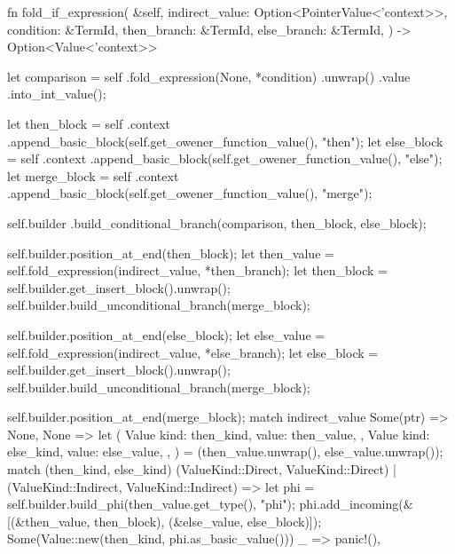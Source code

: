 \documentclass[
  oneside,
  english,
  coorientadorbanca,
  noabntexcite
]{ufsc-thesis-rn46-2019}
\begin{document}
\begin{rustcode}
{    fn fold_if_expression(
        &self,
        indirect_value: Option<PointerValue<'context>>,
        condition: &TermId,
        then_branch: &TermId,
        else_branch: &TermId,
    ) -> Option<Value<'context>> {
        let comparison = self
            .fold_expression(None, *condition)
            .unwrap()
            .value
            .into_int_value();

        let then_block = self
            .context
            .append_basic_block(self.get_owener_function_value(), "then");
        let else_block = self
            .context
            .append_basic_block(self.get_owener_function_value(), "else");
        let merge_block = self
            .context
            .append_basic_block(self.get_owener_function_value(), "merge");

        self.builder
            .build_conditional_branch(comparison, then_block, else_block);

        self.builder.position_at_end(then_block);
        let then_value = self.fold_expression(indirect_value, *then_branch);
        let then_block = self.builder.get_insert_block().unwrap();
        self.builder.build_unconditional_branch(merge_block);

        self.builder.position_at_end(else_block);
        let else_value = self.fold_expression(indirect_value, *else_branch);
        let else_block = self.builder.get_insert_block().unwrap();
        self.builder.build_unconditional_branch(merge_block);

        self.builder.position_at_end(merge_block);
        match indirect_value {
            Some(ptr) => None,
            None => {
                let (
                    Value {
                        kind: then_kind,
                        value: then_value,
                    },
                    Value {
                        kind: else_kind,
                        value: else_value,
                    },
                ) = (then_value.unwrap(), else_value.unwrap());
                match (then_kind, else_kind) {
                    (ValueKind::Direct, ValueKind::Direct)
                    | (ValueKind::Indirect, ValueKind::Indirect) => {
                        let phi = self.builder.build_phi(then_value.get_type(), "phi");
                        phi.add_incoming(&[(&then_value, then_block), (&else_value, else_block)]);
                        Some(Value::new(then_kind, phi.as_basic_value()))
                    }
                    _ => panic!(),
                }
            }
        }
    }

}
\end{rustcode}
\end{document}
